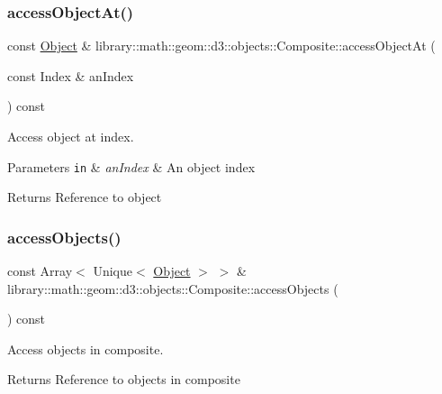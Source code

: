\subsubsection{\texorpdfstring{access\+Object\+At()}{accessObjectAt()}}
{\footnotesize\ttfamily const \hyperlink{classlibrary_1_1math_1_1geom_1_1d3_1_1_object}{Object} \& library\+::math\+::geom\+::d3\+::objects\+::\+Composite\+::access\+Object\+At (\begin{DoxyParamCaption}\item[{const Index \&}]{an\+Index }\end{DoxyParamCaption}) const}



Access object at index. 


\begin{DoxyParams}[1]{Parameters}
\mbox{\tt in}  & {\em an\+Index} & An object index \\
\hline
\end{DoxyParams}
\begin{DoxyReturn}{Returns}
Reference to object 
\end{DoxyReturn}
\mbox{\label{classlibrary_1_1math_1_1geom_1_1d3_1_1objects_1_1_composite_a1866df0e9b60a4badf60ad49ba7e9ea0}} 
\subsubsection{\texorpdfstring{access\+Objects()}{accessObjects()}}
{\footnotesize\ttfamily const Array$<$ Unique$<$ \hyperlink{classlibrary_1_1math_1_1geom_1_1d3_1_1_object}{Object} $>$ $>$ \& library\+::math\+::geom\+::d3\+::objects\+::\+Composite\+::access\+Objects (\begin{DoxyParamCaption}{ }\end{DoxyParamCaption}) const}



Access objects in composite. 

\begin{DoxyReturn}{Returns}
Reference to objects in composite 
\end{DoxyReturn}
\mbox{\label{classlibrary_1_1math_1_1geom_1_1d3_1_1objects_1_1_composite_a607850ccaeaea1dcd0cc57f986bea243}} 
